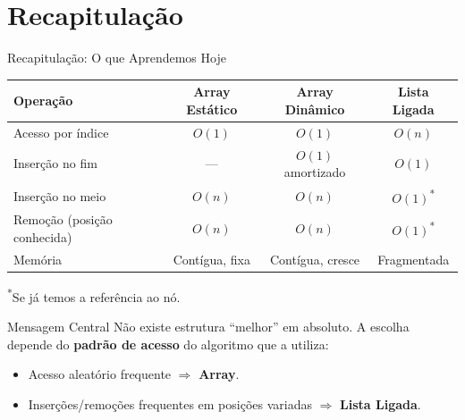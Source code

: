 \documentclass[aspectratio=169]{beamer}
\begin{document}
\section{Recapitulação}

\begin{frame}{Recapitulação: O que Aprendemos Hoje}
    \centering
    \renewcommand{\arraystretch}{1.4}
    \begin{tabular}{@{} l c c c @{}}
        \hline
        \textbf{Operação} & \textbf{Array Estático} & \textbf{Array Dinâmico} & \textbf{Lista Ligada} \\
        \hline
        Acesso por índice & $O(1)$ & $O(1)$ & $O(n)$ \\
        Inserção no fim & --- & $O(1)$ amortizado & $O(1)$ \\
        Inserção no meio & $O(n)$ & $O(n)$ & $O(1)$\textsuperscript{*} \\
        Remoção (posição conhecida) & $O(n)$ & $O(n)$ & $O(1)$\textsuperscript{*} \\
        Memória & Contígua, fixa & Contígua, cresce & Fragmentada \\
        \hline
    \end{tabular}

    {\scriptsize \textsuperscript{*}Se já temos a referência ao nó.}

    \vspace{0.4cm}
    \begin{block}{Mensagem Central}
        Não existe estrutura ``melhor'' em absoluto. A escolha depende do \textbf{padrão de acesso} do algoritmo que a utiliza:
        \begin{itemize}
            \item Acesso aleatório frequente $\Rightarrow$ \textbf{Array}.
            \item Inserções/remoções frequentes em posições variadas $\Rightarrow$ \textbf{Lista Ligada}.
        \end{itemize}
    \end{block}
\end{frame}
\end{document}

